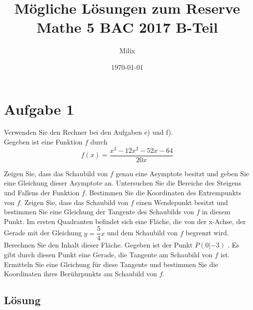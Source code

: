 \documentclass{article}
\title{Mögliche Lösungen zum Reserve Mathe 5 BAC 2017 B-Teil}
\author{Milix}
\date{\today}
\begin{document}
\maketitle

\section*{Aufgabe 1}
Verwenden Sie den Rechner bei den Aufgaben e) und f). \\
Gegeben ist eine Funktion \(f\) durch
\[f(x)=\frac{x^3-12x^2-52x-64}{20x}\]
\begin{tasks}
    \task Zeigen Sie, dass das Schaubild von \(f\) genau eine Asymptote besitzt
    und geben Sie eine Gleichung dieser Asymptote an.
    \task Untersuchen Sie die Bereiche des Steigens und Fallens der Funktion \(f\).
    \task Bestimmen Sie die Koordinaten des Extrempunkts von \(f\).
    \task Zeigen Sie, dass das Schaubild von \(f\) einen Wendepunkt besitzt und
    bestimmen Sie eine Gleichung der Tangente des Schaubilds von \(f\) in
    diesem Punkt.
    \task Im ersten Quadranten befindet sich eine Fläche, die von der x-Achse,
    der Gerade mit der Gleichung \(y=\dfrac{5}{4}x\) und dem Schaubild von \(f\)
    begrenzt wird. \\
    Berechnen Sie den Inhalt dieser Fläche.
    \task Gegeben ist der Punkt \(P(0|-3)\) . Es gibt durch diesen Punkt eine
    Gerade, die Tangente am Schaubild von \(f\) ist. \\
    Ermitteln Sie eine Gleichung für diese Tangente und bestimmen Sie die
    Koordinaten ihres Berührpunkts am Schaubild von \(f\).
\end{tasks}

\subsection*{Lösung}

\newpage
\end{document}
